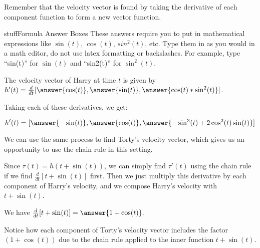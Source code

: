 \documentclass{ximera}
\begin{document}
\begin{problem}
    Remember that the velocity vector is found by taking the derivative of each component function to form a new vector function. 
    
    \begin{expandable}{stuff}{Formula Answer Boxes}
        These answers require you to put in mathematical expressions like $\sin(t)$, $\cos(t)$, $sin^2(t)$, etc. Type them in as you would in a math editor, do not use latex formatting or backslashes. For example, type ``sin(t)'' for $\sin(t)$ and ``sin\^2(t)'' for $\sin^2(t)$.
    \end{expandable}

    The velocity vector of Harry at time $t$ is given by $h'(t)=\frac{d}{dt}[ \answer{\cos(t)}, \answer{\sin(t)}, \answer{\cos(t)*\sin^2(t)}]$.
    
    Taking each of these derivatives, we get:

    \[h'(t)=[ \answer{-\sin(t)}, \answer{\cos(t)}, \answer{-\sin^3(t)+2\cos^2(t)\sin(t)}]\]
\end{problem}

We can use the same process to find Torty's velocity vector, which gives us an opportunity to use the chain rule in this setting.

\begin{problem}
    Since $\tau(t)=h(t+\sin(t))$, we can simply find $\tau'(t)$ using the chain rule if we find $\frac{d}{dt}[t+\sin(t)]$ first. Then we just multiply this derivative by each component of Harry's velocity, and we compose Harry's velocity with $t+\sin(t)$.

    We have $\frac{d}{dt}[t+\sin(t)]=\answer{1+\cos(t)}$.
    
    \begin{feedback}
        Notice how each component of Torty's velocity vector includes the factor $(1+\cos(t))$ due to the chain rule applied to the inner function $t+\sin(t)$.
    \end{feedback}

\end{problem}
\end{document}
